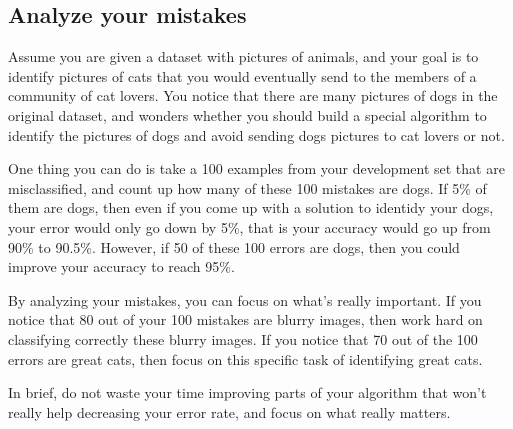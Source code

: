 \documentclass[12pt]{article}
\begin{document}
\subsection*{Analyze your mistakes}

Assume you are given a dataset with pictures of animals, and your goal is to identify pictures of cats that you would eventually send to the members of a community of cat lovers. You notice that there are many pictures of dogs in the original dataset, and wonders whether you should build a special algorithm to identify the pictures of dogs and avoid sending dogs pictures to cat lovers or not.

One thing you can do is take a 100 examples from your development set that are misclassified, and count up how many of these 100 mistakes are dogs. If 5\% of them are dogs, then even if you come up with a solution to identidy your dogs, your error would only go down by 5\%, that is your accuracy would go up from 90\% to 90.5\%. However, if 50 of these 100 errors are dogs, then you could improve your accuracy to reach 95\%.

By analyzing your mistakes, you can focus on what's really important. If you notice that 80 out of your 100 mistakes are blurry images, then work hard on classifying correctly these blurry images. If you notice that 70 out of the 100 errors are great cats, then focus on this specific task of identifying great cats.

In brief, do not waste your time improving parts of your algorithm that won't really help decreasing your error rate, and focus on what really matters.
\end{document}
